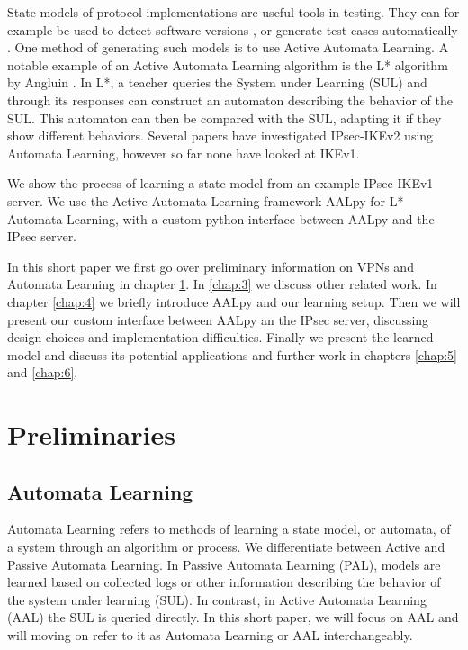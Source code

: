 \documentclass[runningheads]{llncs}
\begin{document}
State models of protocol implementations are useful tools in testing. They can for example be used to detect software versions \cite{pferscher2021fingerprinting}, or generate test cases automatically \cite{pferscher2022fuzzing}. One method of generating such models is to use Active Automata Learning. A notable example of an Active Automata Learning algorithm is the L* algorithm by Angluin \cite{angluin1987learning}. In L*, a teacher queries the System under Learning (SUL) and through its responses can construct an automaton describing the behavior of the SUL. This automaton can then be compared with the SUL, adapting it if they show different behaviors. Several papers have investigated IPsec-IKEv2 using Automata Learning, however so far none have looked at IKEv1. 

We show the process of learning a state model from an example IPsec-IKEv1 server. We use the Active Automata Learning framework AALpy \cite{muvskardin2022aalpy} for L* Automata Learning, with a custom python interface between AALpy and the IPsec server.

In this short paper we first go over preliminary information on VPNs and Automata Learning in chapter \ref{chap:2}. In \ref{chap:3} we discuss other related work. In chapter \ref{chap:4} we briefly introduce AALpy and our learning setup. Then we will present our custom interface between AALpy an the IPsec server, discussing design choices and implementation difficulties. Finally we present the learned model and discuss its potential applications and further work in chapters \ref{chap:5} and \ref{chap:6}.



\section{Preliminaries} \label{chap:2} %
\subsection{Automata Learning}
Automata Learning refers to methods of learning a state model, or automata, of a system through an algorithm or process. We differentiate between Active and Passive Automata Learning. In Passive Automata Learning (PAL), models are learned based on collected logs or other information describing the behavior of the system under learning (SUL). In contrast, in Active Automata Learning (AAL) the SUL is queried directly. In this short paper, we will focus on AAL and will moving on refer to it as Automata Learning or AAL interchangeably. 
\end{document}

